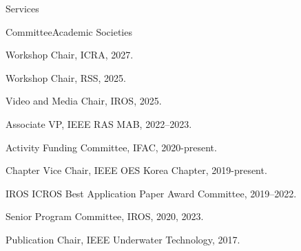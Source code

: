 \begin{rSection}{Services}

\begin{rSubsection}{Committee}{}{Academic Societies}{}
  \item Workshop Chair, ICRA, 2027.
  \item Workshop Chair, RSS, 2025.
  \item Video and Media Chair, IROS, 2025.
  \item Associate VP, IEEE RAS MAB, 2022--2023.
  \item Activity Funding Committee, IFAC, 2020-present.
  \item Chapter Vice Chair, IEEE OES Korea Chapter, 2019-present.
  \item IROS ICROS Best Application Paper Award Committee, 2019--2022.



  \item Senior Program Committee, IROS, 2020, 2023.


  \item Publication Chair, IEEE Underwater Technology, 2017.

\end{rSubsection}


%
%


\end{rSection}
